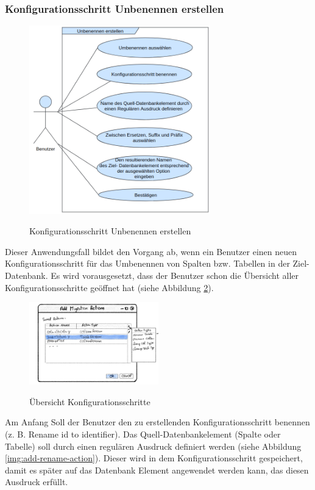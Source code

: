 \subsubsection{Konfigurationsschritt \textbf{Unbenennen} erstellen}
	\begin{figure}[H]
		\caption{Konfigurationsschritt \glqq Unbenennen \grqq erstellen}
		\centering
		\includegraphics[width=0.7\textwidth]{images/af/af-umbenennen}
		\label{img:af-umbenennen}
	\end{figure}
Dieser Anwendungsfall bildet den Vorgang ab, wenn ein Benutzer einen neuen Konfigurationsschritt für das Umbenennen von Spalten bzw. Tabellen in der Ziel-Datenbank. Es wird vorausgesetzt, dass der Benutzer schon die Übersicht aller Konfigurationsschritte geöffnet hat (siehe Abbildung \ref{img:actions-overview}). \\
\begin{figure}[H]
	\caption{Übersicht Konfigurationsschritte}
	\centering
	\includegraphics[width=0.5\textwidth]{images/actions-overview}
	\label{img:actions-overview}
\end{figure}
Am Anfang Soll der Benutzer den zu erstellenden Konfigurationsschritt benennen (z. B. Rename id to identifier). Das Quell-Datenbankelement (Spalte oder Tabelle) soll durch einen regulären Ausdruck definiert werden (siehe Abbildung \ref{img:add-rename-action}). Dieser wird in dem Konfigurationsschritt gespeichert, damit es später auf das Datenbank Element angewendet werden kann, das diesen Ausdruck erfüllt.
